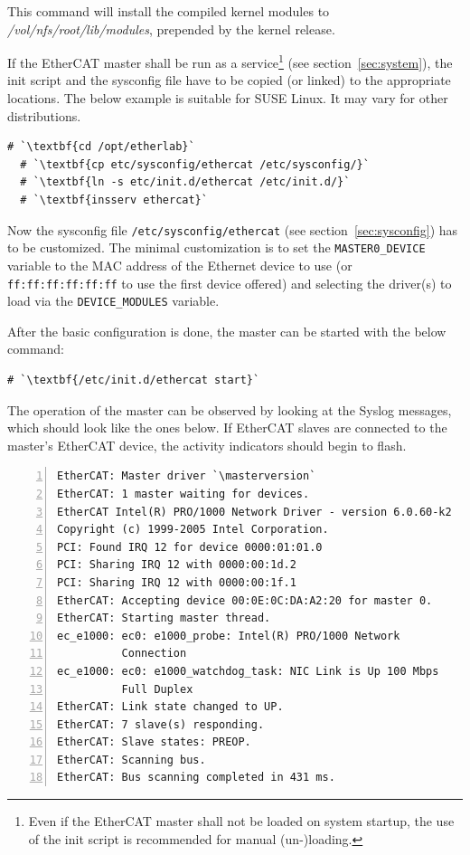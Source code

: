 \documentclass[a4paper,12pt,BCOR6mm,bibtotoc,idxtotoc]{scrbook}
\newcommand{\masterversion}{1.4.0}
\begin{document}
This command will install the compiled kernel modules to
\textit{/vol/nfs/root/lib/modules}, prepended by the kernel release.

If the EtherCAT master shall be run as a service\footnote{Even if the EtherCAT
master shall not be loaded on system startup, the use of the init script is
recommended for manual (un-)loading.} (see section~\ref{sec:system}), the init
script and the sysconfig file have to be copied (or linked) to the appropriate
locations. The below example is suitable for SUSE Linux. It may vary for other
distributions.

\begin{lstlisting}[gobble=2]
  # `\textbf{cd /opt/etherlab}`
  # `\textbf{cp etc/sysconfig/ethercat /etc/sysconfig/}`
  # `\textbf{ln -s etc/init.d/ethercat /etc/init.d/}`
  # `\textbf{insserv ethercat}`
\end{lstlisting}

Now the sysconfig file \texttt{/etc/sysconfig/ethercat} (see
section~\ref{sec:sysconfig}) has to be customized. The minimal customization
is to set the \lstinline+MASTER0_DEVICE+ variable to the MAC address of the
Ethernet device to use (or \lstinline+ff:ff:ff:ff:ff:ff+ to use the first
device offered) and selecting the driver(s) to load via the
\lstinline+DEVICE_MODULES+ variable.

After the basic configuration is done, the master can be started with
the below command:

\begin{lstlisting}[gobble=2]
  # `\textbf{/etc/init.d/ethercat start}`
\end{lstlisting}

The operation of the master can be observed by looking at the
Syslog messages, which should look like the ones below.  If
EtherCAT slaves are connected to the master's EtherCAT device, the activity
indicators should begin to flash.

\begin{lstlisting}[numbers=left]
EtherCAT: Master driver `\masterversion`
EtherCAT: 1 master waiting for devices.
EtherCAT Intel(R) PRO/1000 Network Driver - version 6.0.60-k2
Copyright (c) 1999-2005 Intel Corporation.
PCI: Found IRQ 12 for device 0000:01:01.0
PCI: Sharing IRQ 12 with 0000:00:1d.2
PCI: Sharing IRQ 12 with 0000:00:1f.1
EtherCAT: Accepting device 00:0E:0C:DA:A2:20 for master 0.
EtherCAT: Starting master thread.
ec_e1000: ec0: e1000_probe: Intel(R) PRO/1000 Network
          Connection
ec_e1000: ec0: e1000_watchdog_task: NIC Link is Up 100 Mbps
          Full Duplex
EtherCAT: Link state changed to UP.
EtherCAT: 7 slave(s) responding.
EtherCAT: Slave states: PREOP.
EtherCAT: Scanning bus.
EtherCAT: Bus scanning completed in 431 ms.
\end{lstlisting}
\end{document}
